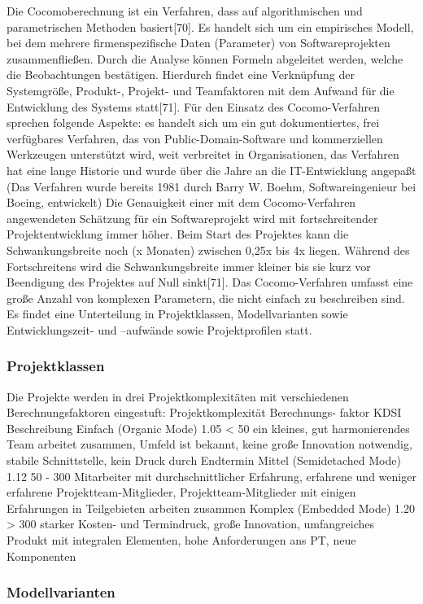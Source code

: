 Die Cocomoberechnung ist ein Verfahren, dass auf algorithmischen und parametrischen Methoden basiert[70]. Es handelt sich um ein empirisches Modell, bei dem mehrere firmenspezifische Daten (Parameter) von Softwareprojekten zusammenfließen. Durch die Analyse können Formeln abgeleitet werden, welche die Beobachtungen bestätigen. Hierdurch findet eine Verknüpfung der Systemgröße, Produkt-, Projekt- und Teamfaktoren mit dem Aufwand für die Entwicklung des Systems statt[71].
Für den Einsatz des Cocomo-Verfahren sprechen folgende Aspekte:
es handelt sich um ein gut dokumentiertes, frei verfügbares Verfahren, das von Public-Domain-Software und kommerziellen Werkzeugen unterstützt wird,
weit verbreitet in Organisationen,
das Verfahren hat eine lange Historie und wurde über die Jahre an die IT-Entwicklung angepaßt (Das Verfahren wurde bereits 1981 durch Barry W. Boehm, Softwareingenieur bei Boeing, entwickelt)
Die Genauigkeit einer mit dem Cocomo-Verfahren angewendeten Schätzung für ein Softwareprojekt wird mit fortschreitender Projektentwicklung immer höher. Beim Start des Projektes kann die Schwankungsbreite noch (x Monaten) zwischen 0,25x bis 4x liegen. Während des Fortschreitens wird die Schwankungsbreite immer kleiner bis sie kurz vor Beendigung des Projektes auf Null sinkt[71].
Das Cocomo-Verfahren umfasst eine große Anzahl von komplexen Parametern, die nicht einfach zu beschreiben sind. Es findet eine Unterteilung in Projektklassen, Modellvarianten sowie Entwicklungszeit- und –aufwände sowie Projektprofilen statt.

\subsubsection{Projektklassen}
Die Projekte werden in drei Projektkomplexitäten mit verschiedenen Berechnungsfaktoren eingestuft:
Projektkomplexität	Berechnungs- faktor	KDSI	Beschreibung
Einfach (Organic Mode)	1.05	< 50	ein kleines, gut harmonierendes Team arbeitet zusammen, Umfeld ist bekannt, keine große Innovation notwendig, stabile Schnittstelle, kein Druck durch Endtermin
Mittel (Semidetached Mode)	1.12	50 - 300	Mitarbeiter mit durchschnittlicher Erfahrung, erfahrene und weniger erfahrene Projektteam-Mitglieder, Projektteam-Mitglieder mit einigen Erfahrungen in Teilgebieten arbeiten zusammen
Komplex (Embedded Mode)	1.20	> 300	starker Kosten- und Termindruck, große Innovation, umfangreiches Produkt mit integralen Elementen, hohe Anforderungen ans PT, neue Komponenten

\subsubsection{Modellvarianten}

